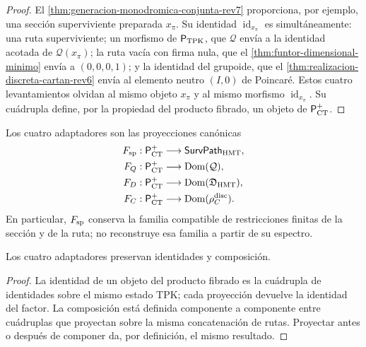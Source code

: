 \begin{proof}
El \cref{thm:generacion-monodromica-conjunta-rev7} proporciona, por ejemplo,
una sección superviviente preparada \(x_\pi\). Su identidad
\(\operatorname{id}_{x_\pi}\) es simultáneamente: una ruta superviviente;
un morfismo de \(\mathsf P_{\rm TPK}\), que \(\mathcal Q\) envía a la
identidad acotada de \(\mathcal Q(x_\pi)\); la ruta vacía con firma nula,
que el \cref{thm:funtor-dimensional-minimo} envía a
\((0,0,0,1)\); y la identidad del grupoide, que el
\cref{thm:realizacion-discreta-cartan-rev6} envía al elemento neutro
\((I,0)\) de Poincaré. Estos cuatro levantamientos olvidan al mismo objeto
\(x_\pi\) y al mismo morfismo \(\operatorname{id}_{x_\pi}\). Su cuádrupla
define, por la propiedad del producto fibrado, un objeto de
\(\mathsf P_{\rm CT}^{+}\).
\end{proof}

\begin{definition}
\label{def:int68-pct-positive}
Los cuatro adaptadores son las proyecciones canónicas
\[
 \begin{aligned}
 F_{\rm sp}:\mathsf P_{\rm CT}^{+}&\longrightarrow
     \mathsf{SurvPath}_{\rm HMT},\\
 F_Q:\mathsf P_{\rm CT}^{+}&\longrightarrow\operatorname{Dom}(\mathcal Q),\\
 F_D:\mathsf P_{\rm CT}^{+}&\longrightarrow
     \operatorname{Dom}(\mathfrak D_{\rm HMT}),\\
 F_C:\mathsf P_{\rm CT}^{+}&\longrightarrow
     \operatorname{Dom}(\rho_C^{\rm disc}).
 \end{aligned}
\]
En particular, \(F_{\rm sp}\) conserva la familia compatible de
restricciones finitas de la sección y de la ruta; no reconstruye esa familia
a partir de su espectro.
\end{definition}

\begin{lemma}
\label{lem:int68-adaptadores}
Los cuatro adaptadores preservan identidades y composición.
\end{lemma}

\begin{proof}
La identidad de un objeto del producto fibrado es la cuádrupla de identidades
sobre el mismo estado TPK; cada proyección devuelve la identidad del factor.
La composición está definida componente a componente entre cuádruplas que
proyectan sobre la misma concatenación de rutas. Proyectar antes o después de
componer da, por definición, el mismo resultado.
\end{proof}

